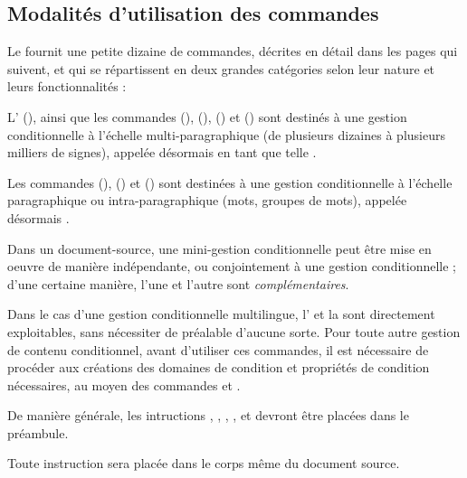 \documentclass{article}
\begin{document}
\subsection{Modalités d'utilisation des commandes}
Le  fournit une petite dizaine de commandes, décrites en détail dans les pages qui suivent, et qui se répartissent en deux grandes catégories selon leur nature et leurs fonctionnalités :

L' (), ainsi que les commandes  (),  (),  () et  () sont destinés à une gestion conditionnelle à l'échelle multi-paragraphique (de plusieurs dizaines à plusieurs milliers de signes), appelée désormais en tant que telle .

Les commandes  (),  () et  () sont destinées à une gestion conditionnelle à l'échelle paragraphique ou intra-paragraphique (mots, groupes de mots), appelée désormais .

Dans un document-source, une mini-gestion conditionnelle peut être mise en oeuvre de manière indépendante, ou conjointement à une gestion conditionnelle ; d'une certaine manière, l'une et l'autre sont \emph{complémentaires}.

Dans le cas d'une gestion conditionnelle multilingue, l' et la  sont directement exploitables, sans nécessiter de préalable d'aucune sorte. Pour toute autre gestion de contenu conditionnel, avant d'utiliser ces commandes, il est nécessaire de procéder aux créations des domaines de condition et propriétés de condition nécessaires, au moyen des commandes  et .

De manière générale, les intructions , , , ,  et  devront être placées dans le préambule.

Toute instruction  sera placée dans le corps même du document source.
\end{document}
